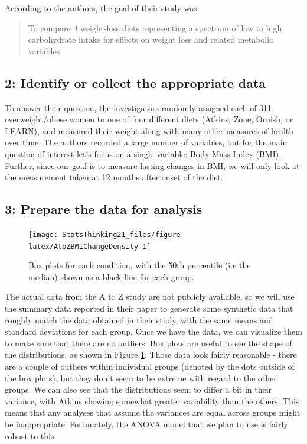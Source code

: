 \documentclass[12pt,]{book}
\theoremstyle{definition}
\theoremstyle{definition}
\theoremstyle{definition}
\theoremstyle{remark}
\begin{document}
According to the authors, the goal of their study was:

\begin{quote}
To compare 4 weight-loss diets representing a spectrum of low to high carbohydrate intake for effects on weight loss and related metabolic variables.
\end{quote}

\hypertarget{identify-or-collect-the-appropriate-data}{%
\subsection{2: Identify or collect the appropriate data}\label{identify-or-collect-the-appropriate-data}}

To answer their question, the investigators randomly assigned each of 311 overweight/obese women to one of four different diets (Atkins, Zone, Ornish, or LEARN), and measured their weight along with many other measures of health over time. The authors recorded a large number of variables, but for the main question of interest let's focus on a single variable: Body Mass Index (BMI). Further, since our goal is to measure lasting changes in BMI, we will only look at the measurement taken at 12 months after onset of the diet.

\hypertarget{prepare-the-data-for-analysis}{%
\subsection{3: Prepare the data for analysis}\label{prepare-the-data-for-analysis}}

\begin{figure}
\texttt{[image: StatsThinking21\_files/figure-latex/AtoZBMIChangeDensity-1]} \caption{Box plots for each condition, with the 50th percentile (i.e the median) shown as a black line for each group.}\label{fig:AtoZBMIChangeDensity}
\end{figure}

The actual data from the A to Z study are not publicly available, so we will use the summary data reported in their paper to generate some synthetic data that roughly match the data obtained in their study, with the same means and standard deviations for each group. Once we have the data, we can visualize them to make sure that there are no outliers. Box plots are useful to see the shape of the distributions, as shown in Figure \ref{fig:AtoZBMIChangeDensity}. Those data look fairly reasonable - there are a couple of outliers within individual groups (denoted by the dots outside of the box plots), but they don't seem to be extreme with regard to the other groups. We can also see that the distributions seem to differ a bit in their variance, with Atkins showing somewhat greater variability than the others. This means that any analyses that assume the variances are equal across groups might be inappropriate. Fortunately, the ANOVA model that we plan to use is fairly robust to this.
\end{document}
